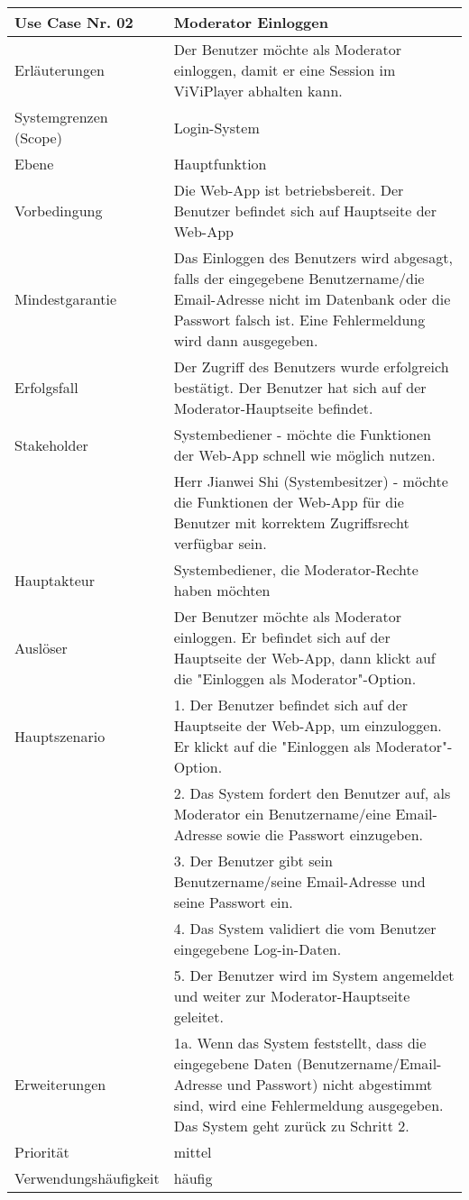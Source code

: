 \begin{tabularx}{\linewidth}{|l|X|}
	\hline
	Use Case Nr. 02			& \textbf{Moderator Einloggen} \\ \hline
	Erläuterungen			& Der Benutzer möchte als Moderator einloggen, damit er eine 
							  Session im ViViPlayer abhalten kann. \\ \hline
	Systemgrenzen (Scope)	& Login-System \\ \hline
	Ebene					& Hauptfunktion \\ \hline
	Vorbedingung			& Die Web-App ist betriebsbereit. Der Benutzer befindet sich auf
							  Hauptseite der Web-App \\ \hline
	Mindestgarantie			& Das Einloggen des Benutzers wird abgesagt, falls der eingegebene
							  Benutzername/die Email-Adresse nicht im Datenbank oder die Passwort falsch ist. Eine Fehlermeldung wird dann ausgegeben.
							  \\ \hline
	Erfolgsfall 			& Der Zugriff des Benutzers wurde erfolgreich bestätigt. Der
							  Benutzer hat sich auf der Moderator-Hauptseite befindet. 
							  \\ \hline
	Stakeholder				& Systembediener - möchte die Funktionen der Web-App schnell 
							  wie möglich nutzen. \\
							& Herr Jianwei Shi (Systembesitzer) - möchte die Funktionen der 
							  Web-App für die Benutzer mit korrektem Zugriffsrecht verfügbar sein.\\ \hline
	Hauptakteur				& Systembediener, die Moderator-Rechte haben möchten \\ \hline
	Auslöser				& Der Benutzer möchte als Moderator einloggen. Er befindet sich 
							  auf der Hauptseite der Web-App, dann klickt auf die "Einloggen als Moderator"-Option.\\ \hline	
	Hauptszenario			& 1. Der Benutzer befindet sich auf der Hauptseite der Web-App, 
							  um einzuloggen. Er klickt auf die "Einloggen als Moderator"-Option.\\
							& 2. Das System fordert den Benutzer auf, als Moderator ein
							  Benutzername/eine Email-Adresse sowie die Passwort einzugeben. \\
							& 3. Der Benutzer gibt sein Benutzername/seine Email-Adresse und 
							  seine Passwort ein. \\
							& 4. Das System validiert die vom Benutzer eingegebene
							  Log-in-Daten. \\
							& 5. Der Benutzer wird im System angemeldet und weiter zur
							  Moderator-Hauptseite geleitet. \\ \hline
	Erweiterungen			& 1a. Wenn das System feststellt, dass die eingegebene Daten 
							  (Benutzername/Email-Adresse und Passwort) nicht abgestimmt sind, wird eine Fehlermeldung ausgegeben. Das System geht 
							  zurück zu Schritt 2. \\ \hline
	Priorität				& mittel \\ \hline
	Verwendungshäufigkeit	& häufig \\ \hline
\end{tabularx}
